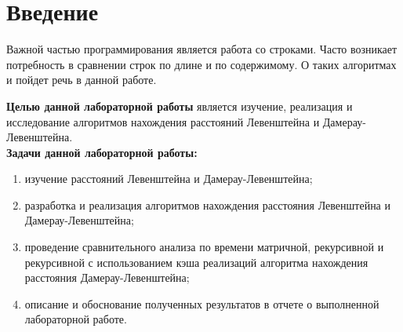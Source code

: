 \newpage
\chapter*{Введение}
Важной частью программирования является работа со строками. Часто возникает потребность в сравнении строк по длине и по содержимому. О таких алгоритмах и пойдет речь в данной работе.
\newline

\textbf{Целью данной лабораторной работы} является изучение, реализация и исследование алгоритмов нахождения расстояний Левенштейна и Дамерау-Левенштейна.\\
\textbf{Задачи данной лабораторной работы:}
\begin{enumerate}
	\item изучение расстояний Левенштейна и Дамерау-Левенштейна;
	\item разработка и реализация алгоритмов нахождения расстояния Левенштейна и Дамерау-Левенштейна;
	\item проведение сравнительного анализа по времени матричной, рекурсивной и рекурсивной с использованием кэша реализаций алгоритма нахождения расстояния Дамерау-Левенштейна;
	\item описание и обоснование полученных результатов в отчете о выполненной лабораторной работе.
\end{enumerate}
